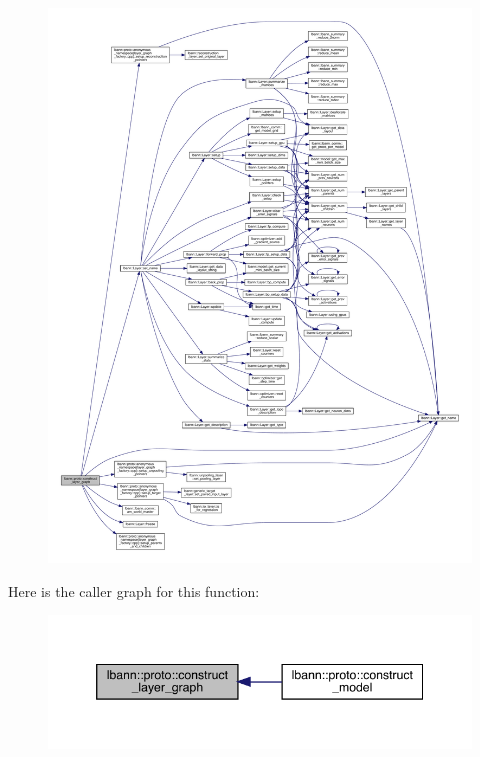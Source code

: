\begin{figure}[H]
\begin{center}
\leavevmode
\includegraphics[width=350pt]{namespacelbann_1_1proto_a99e65cd4abb769d020ab76ff20c39d0b_cgraph}
\end{center}
\end{figure}
Here is the caller graph for this function\+:\nopagebreak
\begin{figure}[H]
\begin{center}
\leavevmode
\includegraphics[width=346pt]{namespacelbann_1_1proto_a99e65cd4abb769d020ab76ff20c39d0b_icgraph}
\end{center}
\end{figure}
\mbox{\label{namespacelbann_1_1proto_a5b2f4094ce02245e778cfd2fa254d7b4}} 
